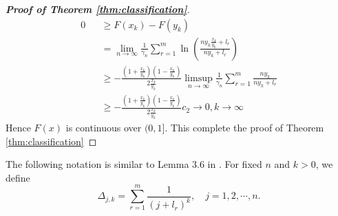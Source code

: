 \documentclass[12pt]{article}
\theoremstyle{plain}
\theoremstyle{definition}
\theoremstyle{remark}
\begin{document}
\begin{proof}[\textit{\textbf{Proof of Theorem \ref{thm:classification}}}]
\begin{eqnarray*}
0&&\geq F(x_k)-F(y_k)\\
  &&= \lim _{n \rightarrow \infty} \frac{1}{\gamma_{n}} \sum_{r=1}^{m} \ln \left(\frac{n y_{k} \frac{x_{k}}{y_{k}}+l_{r}}{n y_{k}+l_{r}}\right)\\
  &&\geq   -\frac{(1+\frac{x_{k}}{y_{k}})(1-\frac{x_{k}}{y_{k}})}{2 \frac{x_{k}}{y_{k}}} \limsup _{n \rightarrow \infty} \frac{1}{\gamma_{n}} \sum_{r=1}^{m} \frac{ ny_k}{ny_k+l_{r}}\\ &&\geq-\frac{\left(1+\frac{x_{k}}{y_{k}}\right)\left(1-\frac{x_{k}}{y_{k}}\right)}{2 \frac{x_{k}}{y_{k}}} c_2\to 0, k\to  \infty
\end{eqnarray*}
Hence $F(x)$ is continuous over $(0,1]$. This complete the proof of Theorem \ref{thm:classification}
\end{proof}

The following notation is similar to Lemma 3.6 in \cite{SRP}.
For fixed $n$ and $k>0$, we define
\begin{equation}\label{def_delta}
\Delta_{j, k}=\sum_{r=1}^{m} \frac{1}{\left(j+l_{r}\right)^{k}}, \quad j=1,2, \cdots, n.
\end{equation}
\end{document}
